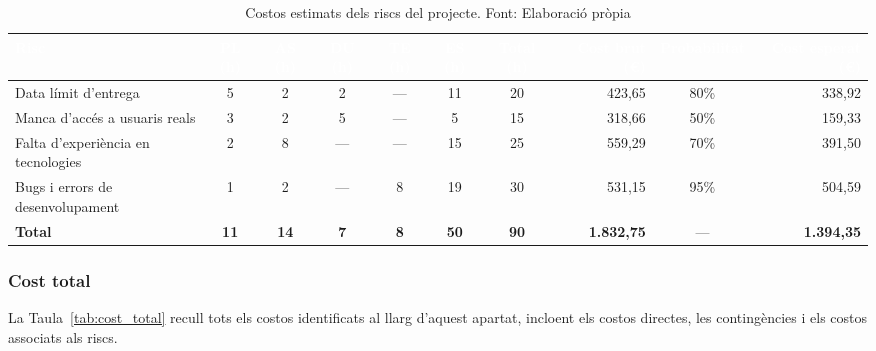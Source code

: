 \documentclass[11pt,a4paper]{report}
\begin{document}
\begin{table}[H]
    \centering
    \small
    \renewcommand{\arraystretch}{2}
    \begin{adjustbox}{max width=\textwidth}
    \begin{tabular}{|l|c|c|c|c|c|c|r|c|r|}
        \hline
        \rowcolor{oceanblue}
        \textcolor{white}{\textbf{Risc}} &
        \textcolor{white}{\textbf{PL (h)}} &
        \textcolor{white}{\textbf{AS (h)}} &
        \textcolor{white}{\textbf{DU (h)}} &
        \textcolor{white}{\textbf{TE (h)}} &
        \textcolor{white}{\textbf{ES (h)}} &
        \textcolor{white}{\textbf{Total (h)}} &
        \textcolor{white}{\textbf{Cost brut (€)}} &
        \textcolor{white}{\textbf{Probabilitat}} &
        \textcolor{white}{\textbf{Cost esperat (€)}} \\
        \hline
        Data límit d'entrega               & 5 & 2 & 2 & --- & 11 & 20 & 423,65 & 80\% & 338,92 \\
        \hline
        Manca d'accés a usuaris reals      & 3 & 2 & 5 & --- &  5 & 15 & 318,66 & 50\% & 159,33 \\
        \hline
        Falta d'experiència en tecnologies & 2 & 8 & --- & --- & 15 & 25 & 559,29 & 70\% & 391,50 \\
        \hline
        Bugs i errors de desenvolupament   & 1 & 2 & --- &  8 & 19 & 30 & 531,15 & 95\% & 504,59 \\
        \hline
        \rowcolor{gray!20}
        \textbf{Total} & \textbf{11} & \textbf{14} & \textbf{7} & \textbf{8} & \textbf{50} & \textbf{90} & \textbf{1.832,75} & --- & \textbf{1.394,35} \\
        \hline
    \end{tabular}
    \end{adjustbox}
    \caption[Costos dels riscs]{Costos estimats dels riscs del projecte. Font: Elaboració pròpia}
    \label{tab:riscs}
\end{table}

\subsubsection{Cost total}

La Taula~\ref{tab:cost_total} recull tots els costos identificats al llarg d'aquest 
apartat, incloent els costos directes, les contingències i els costos associats als riscs.
\end{document}
